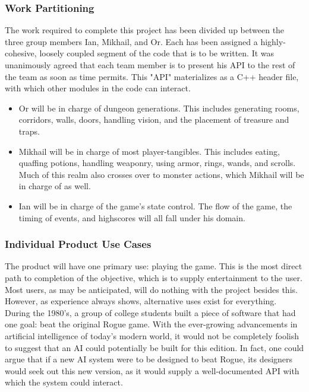 \documentclass[12pt, titlepage]{article}
\begin{document}
		\subsubsection{Work Partitioning}

		The work required to complete this project has been divided up between the three group members Ian, Mikhail, and Or. Each has been assigned a highly-cohesive, loosely coupled segment of the code that is to be written. It was unanimously agreed that each team member is to present his API to the rest of the team as soon as time permits. This "API" materializes as a C++ header file, with which other modules in the code can interact.\\

		\begin{itemize}
			\item Or will be in charge of dungeon generations. This includes generating rooms, corridors, walls, doors, handling vision, and the placement of treasure and traps.
			\item Mikhail will be in charge of most player-tangibles. This includes eating, quaffing potions, handling weaponry, using armor, rings, wands, and scrolls. Much of this realm also crosses over to monster actions, which Mikhail will be in charge of as well.\\
			\item Ian will be in charge of the game's state control. The flow of the game, the timing of events, and highscores will all fall under his domain.\\
		\end{itemize}
		
		\subsubsection{Individual Product Use Cases}

		The product will have one primary use: playing the game. This is the most direct path to completion of the objective, which is to supply entertainment to the user. Most users, as may be anticipated, will do nothing with the project besides this. However, as experience always shows, alternative uses exist for everything. During the 1980's, a group of college students built a piece of software that had one goal: beat the original Rogue game. With the ever-growing advancements in artificial intelligence of today's modern world, it would not be completely foolish to suggest that an AI could potentially be built for this edition. In fact, one could argue that if a new AI system were to be designed to beat Rogue, its designers would seek out this new version, as it would supply a well-documented API with which the system could interact.
\end{document}
